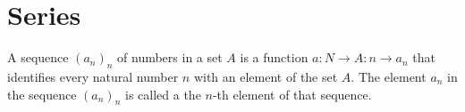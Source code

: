 \documentclass[main.tex]{subfiles}
\begin{document}
\chapter{Series}

\begin{de}
  A sequence $(a_{n})_{n}$ of numbers in a set $A$ is a function $a: N
  \rightarrow A: n \rightarrow a_{n}$ that identifies every natural number $n$ with an element of
  the set $A$. The element $a_{n}$ in the sequence $(a_{n})_{n}$ is called a the
  $n$-th element of that sequence.
\end{de}
\end{document}
